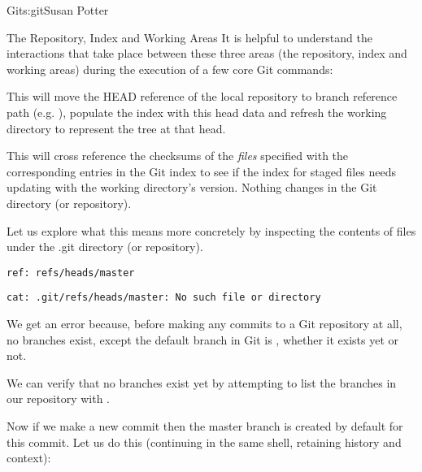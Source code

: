 \begin{aosachapter}{Git}{s:git}{Susan Potter}
\begin{aosasect1}{The Repository, Index and Working Areas}
It is helpful to understand the interactions that take place between these
three areas (the repository, index and working areas) during the execution
of a few core Git commands:

\begin{aosaitemize}
  \item {} \newline
  \small{This will move the HEAD reference of the local repository to branch
  reference path (e.g. ), populate the index with
  this head data and refresh the working directory to represent the tree
  at that head.}
  \item {} \newline
  \small{This will cross reference the checksums of the \emph{files}
  specified with the corresponding entries in the Git index to see if the
  index for staged files needs updating with the working directory's
  version. Nothing changes in the Git directory (or repository).}
\end{aosaitemize}

Let us explore what this means more concretely by inspecting the contents of
files under the .git directory (or repository).

\begin{aosaitemize}
  \item {}
  \item {}
\begin{verbatim}
ref: refs/heads/master
\end{verbatim}
  \item {}
  \item {}
\begin{verbatim}
cat: .git/refs/heads/master: No such file or directory
\end{verbatim}
\end{aosaitemize}

We get an error because, before making any commits to a Git repository at
all, no branches exist, except the default branch in Git is ,
whether it exists yet or not.

We can verify that no branches exist yet by attempting to list the branches
in our repository with .

Now if we make a new commit then the master branch is created by default for
this commit. Let us do this (continuing in the same shell, retaining
history and context):


\end{aosasect1}
\end{aosachapter}
